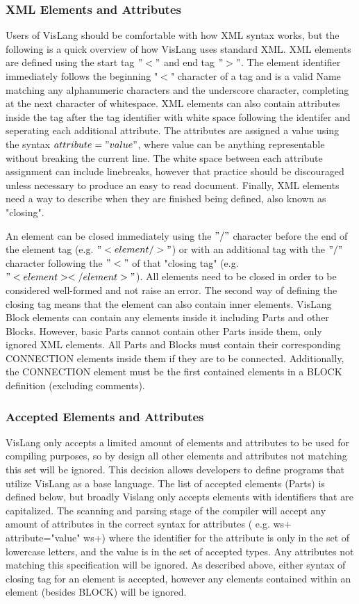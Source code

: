 \subsubsection{XML Elements and Attributes}
Users of VisLang should be comfortable with how XML syntax works, but the following is a quick overview of how VisLang uses standard XML.
XML elements are defined using the start tag $"<"$ and end tag $">"$.
The element identifier immediately follows the beginning "$<$" character of a tag and is a valid Name matching any alphanumeric characters and the underscore character, completing at the next character of whitespace.
XML elements can also contain attributes inside the tag after the tag identifier with white space following the identifer and seperating each additional attribute.
The attributes are assigned a value using the syntax $attribute="value"$, where value can be anything representable without breaking the current line.
The white space between each attribute assignment can include linebreaks, however that practice should be discouraged unless necessary to produce an easy to read document.
Finally, XML elements need a way to describe when they are finished being defined, also known as "closing".
\par
An element can be closed immediately using the $"/"$ character before the end of the element tag (e.g. $"<element/>"$) or with an additional tag with the $"/"$ character following the $"<"$ of that "closing tag" (e.g. $"<element></element>"$).
All elements need to be closed in order to be considered well-formed and not raise an error.
The second way of defining the closing tag means that the element can also contain inner elements.
VisLang Block elements can contain any elements inside it including Parts and other Blocks.
However, basic Parts cannot contain other Parts inside them, only ignored XML elements.
All Parts and Blocks must contain their corresponding CONNECTION elements inside them if they are to be connected.
Additionally, the CONNECTION element must be the first contained elements in a BLOCK definition (excluding comments).
\subsubsection{Accepted Elements and Attributes}
VisLang only accepts a limited amount of elements and attributes to be used for compiling purposes, so by design all other elements and attributes not matching this set will be ignored.
This decision allows developers to define programs that utilize VisLang as a base language.
The list of accepted elements (Parts) is defined below, but broadly Vislang only accepts elements with identifiers that are capitalized.
The scanning and parsing stage of the compiler will accept any amount of attributes in the correct syntax for attributes ( e.g.
ws+ attribute="value" ws+) where the identifier for the attribute is only in the set of lowercase letters, and the value is in the set of accepted types.
Any attributes not matching this specification will be ignored.
As described above, either syntax of closing tag for an element is accepted, however any elements contained within an element (besides BLOCK) will be ignored.
